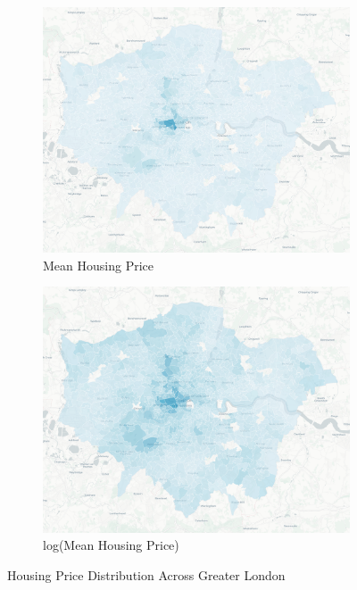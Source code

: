 \documentclass{article}
\begin{document}
\begin{figure}[t]
  \centering
  \begin{subfigure}{.45\textwidth}
      \centering
      \includegraphics[width=.95\linewidth]{images/housing_raw_mean.png}
      \caption{Mean Housing Price}
      \label{fig:1(a)}
  \end{subfigure}
  \begin{subfigure}{.45\textwidth}
      \centering
      \includegraphics[width=.95\linewidth]{images/housing_log_mean.png}
      \caption{log(Mean Housing Price)}
      \label{fig:1(b)}
  \end{subfigure}
  \caption{Housing Price Distribution Across Greater London}
  \label{fig:price_distribution}
\end{figure}
\end{document}
